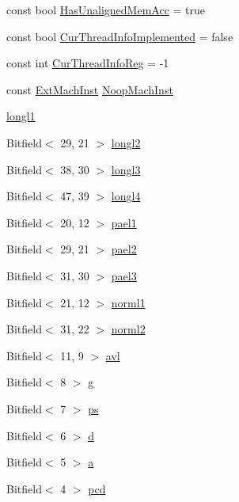 \begin{DoxyCompactItemize}
const bool \hyperlink{namespaceX86ISA_a1c3adbc67ce574fe545e332d3bc677be}{HasUnalignedMemAcc} = true
\item 
const bool \hyperlink{namespaceX86ISA_a9faf3aac879cfa867d4ae15d4119c45e}{CurThreadInfoImplemented} = false
\item 
const int \hyperlink{namespaceX86ISA_a7e5bf2f33f34327efc1eeccbb0c1141f}{CurThreadInfoReg} = -\/1
\item 
const \hyperlink{structX86ISA_1_1ExtMachInst}{ExtMachInst} \hyperlink{namespaceX86ISA_a8d1e39e0ea757dcc9725c6ccd81dd4c4}{NoopMachInst}
\item 
\hyperlink{namespaceX86ISA_a2df3b770b75b2863de3e2258b71945cb}{longl1}
\item 
Bitfield$<$ 29, 21 $>$ \hyperlink{namespaceX86ISA_a7f152ead04fba9b14abd1068f148add6}{longl2}
\item 
Bitfield$<$ 38, 30 $>$ \hyperlink{namespaceX86ISA_a00e18fee73ee9aef71c0ea9dc0c0a8a6}{longl3}
\item 
Bitfield$<$ 47, 39 $>$ \hyperlink{namespaceX86ISA_a3b530e832420d1e43321be7126db2c61}{longl4}
\item 
Bitfield$<$ 20, 12 $>$ \hyperlink{namespaceX86ISA_a541e3530d0b0f23502c18586337ee243}{pael1}
\item 
Bitfield$<$ 29, 21 $>$ \hyperlink{namespaceX86ISA_abc575d753d5773b80938c25879afea66}{pael2}
\item 
Bitfield$<$ 31, 30 $>$ \hyperlink{namespaceX86ISA_ac5906e9f191805a7e1bf75c616503363}{pael3}
\item 
Bitfield$<$ 21, 12 $>$ \hyperlink{namespaceX86ISA_aa4dcc3fc4835349492b2c3024ae2a224}{norml1}
\item 
Bitfield$<$ 31, 22 $>$ \hyperlink{namespaceX86ISA_a8820b4b084a309650068f08c9f0d54ae}{norml2}
\item 
Bitfield$<$ 11, 9 $>$ \hyperlink{namespaceX86ISA_a64b27f5ab0883ac3f59ecff143dfa629}{avl}
\item 
Bitfield$<$ 8 $>$ \hyperlink{namespaceX86ISA_a1dd1566ee279cd9c520108ca170094d6}{g}
\item 
Bitfield$<$ 7 $>$ \hyperlink{namespaceX86ISA_a5968ec061eaa50b53d7c0057cdf1a587}{ps}
\item 
Bitfield$<$ 6 $>$ \hyperlink{namespaceX86ISA_acd8486c4634bb00697efd4301fc64e25}{d}
\item 
Bitfield$<$ 5 $>$ \hyperlink{namespaceX86ISA_a10d3d5eba86314098a6836272a0215fe}{a}
\item 
Bitfield$<$ 4 $>$ \hyperlink{namespaceX86ISA_a0adf24e6f0b519d81be93ba0c3e917e2}{pcd}

\end{DoxyCompactItemize}
